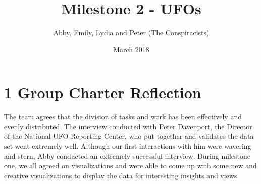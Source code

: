 \documentclass{neu_handout}
\title{Milestone 2 - UFOs}
\author{Abby, Emily, Lydia and Peter (The Conspiracists)}
\date{March 2018}
\begin{document}
\section*{1 Group Charter Reflection}

The team agrees that the division of tasks and work has been effectively and evenly distributed. The interview conducted with Peter Davenport, the Director of the National UFO Reporting Center, who put together and validates the data set went extremely well. Although our first interactions with him were wavering and stern, Abby conducted an extremely successful interview. During milestone one, we all agreed on visualizations and were able to come up with some new and creative visualizations to display the data for interesting insights and views.
\end{document}
